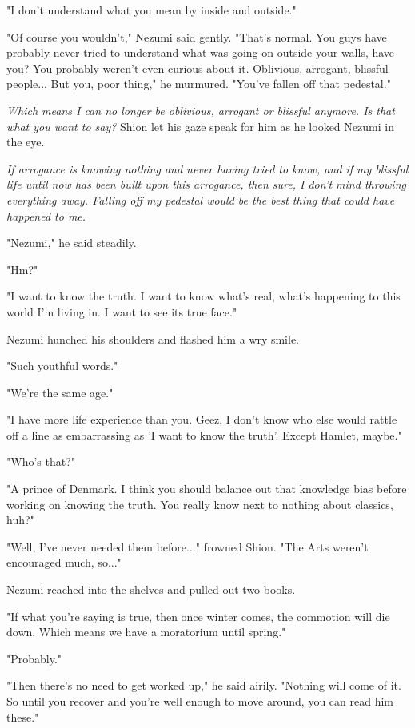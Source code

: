 "I don't understand what you mean by inside and outside."

"Of course you wouldn't," Nezumi said gently. "That's normal. You guys
have probably never tried to understand what was going on outside your
walls, have you? You probably weren't even curious about it. Oblivious,
arrogant, blissful people... But you, poor thing," he murmured. "You've
fallen off that pedestal."

\emph{Which means I can no longer be oblivious, arrogant or blissful anymore.
Is that what you want to say?} Shion let his gaze speak for him as he
looked Nezumi in the eye.

\emph{If arrogance is knowing nothing and never having tried to know, and if
my blissful life until now has been built upon this arrogance, then
sure, I don't mind throwing everything away. Falling off my pedestal
would be the best thing that could have happened to me.}

"Nezumi," he said steadily.

"Hm?"

"I want to know the truth. I want to know what's real, what's happening
to this world I'm living in. I want to see its true face."

Nezumi hunched his shoulders and flashed him a wry smile.

"Such youthful words."

"We're the same age."

"I have more life experience than you. Geez, I don't know who else would
rattle off a line as embarrassing as 'I want to know the truth'. Except
Hamlet, maybe."

"Who's that?"

"A prince of Denmark. I think you should balance out that knowledge bias
before working on knowing the truth. You really know next to nothing
about classics, huh?"

"Well, I've never needed them before..." frowned Shion. "The Arts
weren't encouraged much, so..."

Nezumi reached into the shelves and pulled out two books.~

"If what you're saying is true, then once winter comes, the commotion
will die down. Which means we have a moratorium until spring."

"Probably."

"Then there's no need to get worked up," he said airily. "Nothing will
come of it. So until you recover and you're well enough to move around,
you can read him these."

